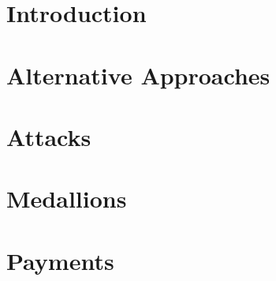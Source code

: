 \documentclass{article}
\begin{document}
\maketitle

    \begin{abstract}
    
    \end{abstract}


    \section{Introduction}
    \label{sec:overview}
    

    \section{Alternative Approaches}
    \label{sec:prior-work}
    
    
    \section{Attacks}
    \label{sec:attacks}
    


    \section{\TOM{}}
    \label{sec:market}
    

    \section{Medallions}
    \label{medallions}
    

    \section{Payments}
    \label{sec:payments}
    

\end{document}

